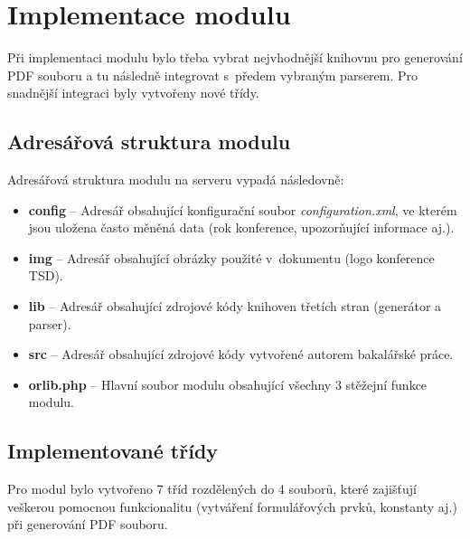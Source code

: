 \DeclarePairedDelimiter\ceil{\lceil}{\rceil}
\DeclarePairedDelimiter\floor{\lfloor}{\rfloor}

\chapter{Implementace modulu}
Při implementaci modulu bylo třeba vybrat nejvhodnější knihovnu pro generování PDF souboru a tu následně integrovat s~předem vybraným parserem. Pro snadnější integraci byly vytvořeny nové třídy.
\section{Adresářová struktura modulu}
Adresářová struktura modulu na serveru vypadá následovně:
\begin{itemize}
	\item \textbf{config} -- Adresář obsahující konfigurační soubor \textit{configuration.xml}, ve kterém jsou uložena často měněná data (rok konference, upozorňující informace aj.).  
	\item \textbf{img} -- Adresář obsahující obrázky použité v~dokumentu (logo konference TSD).
	\item \textbf{lib} -- Adresář obsahující zdrojové kódy knihoven třetích stran (generátor a parser).
	\item \textbf{src} -- Adresář obsahující zdrojové kódy vytvořené autorem bakalářské práce.
	\item \textbf{orlib.php} -- Hlavní soubor modulu obsahující všechny 3 stěžejní funkce modulu.
\end{itemize}
\section{Implementované třídy}
Pro modul bylo vytvořeno 7 tříd rozdělených do 4 souborů, které zajišťují veškerou pomocnou funkcionalitu (vytváření formulářových prvků, konstanty aj.) při generování PDF souboru. 
